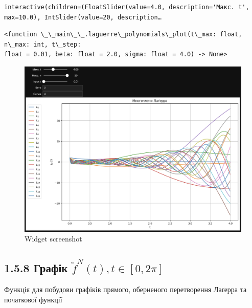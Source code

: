 \documentclass[11pt]{article}
\makeatletter
\newcommand{\boxspacing}{\kern\kvtcb@left@rule\kern\kvtcb@boxsep}
\newcommand{\prompt}[4]{
        {\ttfamily\llap{{\color{#2}[#3]:\hspace{3pt}#4}}\vspace{-\baselineskip}}
    }
\makeatother
\begin{document}
    
    \begin{Verbatim}[commandchars=\\\{\}]
interactive(children=(FloatSlider(value=4.0, description='Макс. t', max=10.0), IntSlider(value=20, description…
    \end{Verbatim}

    
            \begin{tcolorbox}[breakable, size=fbox, boxrule=.5pt, pad at break*=1mm, opacityfill=0]
\prompt{Out}{outcolor}{14}{\boxspacing}
\begin{Verbatim}[commandchars=\\\{\}]
<function \_\_main\_\_.laguerre\_polynomials\_plot(t\_max: float, n\_max: int, t\_step:
float = 0.01, beta: float = 2.0, sigma: float = 4.0) -> None>
\end{Verbatim}
\end{tcolorbox}
        
    \begin{figure}
\centering
\includegraphics{screenshots/6.png}
\caption{Widget screenshot}
\end{figure}
\newpage

    \subsection*{\texorpdfstring{1.5.8 Графік
\(\widetilde{f}^N(t), t\in[0, 2\pi]\)}{1.5.8 Графік \textbackslash widetilde\{f\}\^{}N(t), t\textbackslash in{[}0, 2\textbackslash pi{]}}}\label{ux433ux440ux430ux444ux456ux43a-widetildefnt-tin0-2pi}

Функція для побудови графіків прямого, оберненого перетворення Лаґерра
та початкової функції
\end{document}
